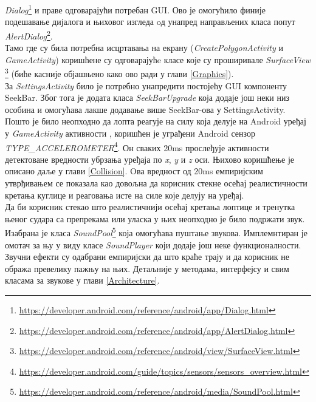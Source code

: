  \emph{Dialog}\footnote{\url{https://developer.android.com/reference/android/app/Dialog.html}} и праве одговарајући потребан GUI. 
 Ово је омогућило финије подешавање дијалога и њиховог изгледа oд унапред направљених класа попут \emph{AlertDialog}\footnote{\url{https://developer.android.com/reference/android/app/AlertDialog.html}}.
\\ \indent 
Тамо где су била потребна исцртавања на екрану (\emph{CreatePolygonActivity} и \emph{GameActivity}) коришћене су одговарајућe класе које су проширивале \emph{SurfaceView} \footnote{\url{https://developer.android.com/reference/android/view/SurfaceView.html}} (биће касније објашњено како ово ради у глави \ref{Graphics}). 
\\ \indent 
За \emph{SettingsActivity} било је потребно  унапредити постојећу GUI компоненту SeekBar. Због тога је додата класа \emph{SeekBarUpgrade} која додаје још неки низ особина и омогућава лакше додавање више SeekBar-ова у SettingsActivity. 
\\ \indent 
Пошто је било неопходно да лопта реагује на силу која делује на Android уређај у \emph{GameActivity} активности , коришћен је уграђени Android сензор 
\emph{TYPE\_ACCELEROMETER}\footnote{\url{https://developer.android.com/guide/topics/sensors/sensors_overview.html}}.
Он сваких \si{20ms} прослеђује активности  детектоване вредности убрзања уређаја по \emph{x}, \emph{y} и \emph{z} оси. Њихово коришћење је описано даље у глави \ref{Collision}. Oва вредност од \si{20ms} емпиријским утврђивањем се показала као довољна да корисник стекне осећај реалистичности кретања куглице и реаговања исте на силе које делују на уређај. 
\\ \indent 
Да би корисник стекао што реалистичнији осећај кретања лоптице и тренутка њеног судара са препрекама или уласка у њих неопходно је било подржати звук. Изабрана је класа \emph{SoundPool}\footnote{\url{https://developer.android.com/reference/android/media/SoundPool.html}} која омогућава пуштање звукова. Имплемнтиран је омотач за њу у виду класе \emph{SoundPlayer} који додаје још неке функционалности. Звучни ефекти су одабрани емпиријски да што краће трају и да корисник не обража превелику пажњу на њих. Детаљније у методама, интерфејсу и свим класама за звукове у глави \ref{Architecture}.

